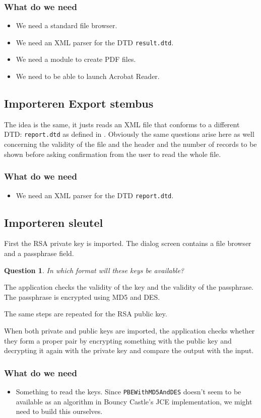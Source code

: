 \documentclass{article}
\newtheorem{question}{Question}
\newenvironment{que}{\begin{question}\addcontentsline{lof}{figure}{Question~\thequestion}}{\end{question}}
\begin{document}
\subsubsection{What do we need}
\begin{itemize}
\item We need a standard file browser.
\item We need an XML parser for the DTD \verb+result.dtd+.
\item We need a module to create PDF files.
\item We need to be able to launch Acrobat Reader.
\end{itemize}
\subsection{Importeren Export stembus}
The idea is the same, it justs reads an XML file that conforms to a different DTD: \verb+report.dtd+ as defined in \cite[\S C.3]{KOALOG}.
Obviously the same questions arise here as well concerning the validity of the file and the header and the number of records to be shown before asking confirmation from the user to read the whole file.
\subsubsection{What do we need}
\begin{itemize}
\item We need an XML parser for the DTD \verb+report.dtd+.
\end{itemize}
\subsection{Importeren sleutel}
First the RSA private key is imported. The dialog screen contains a file browser and a passphrase field.
\begin{que}
In which format will these keys be available?
\end{que}
The application checks the validity of the key and the validity of the passphrase. The passphrase is encrypted using MD5 and DES.

The same steps are repeated for the RSA public key.

When both private and public keys are imported, the application checks whether they form a proper pair by encrypting something with the public key and decrypting it again with the private key and compare the output with the input.
\subsubsection{What do we need}
\begin{itemize}
\item Something to read the keys. Since \verb+PBEWithMD5AndDES+ doesn't seem to be available as an algorithm in Bouncy Castle's JCE implementation, we might need to build this ourselves.
\end{itemize}
\end{document}
